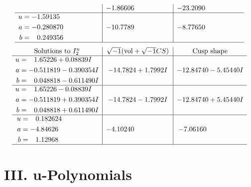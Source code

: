 \documentclass[1p]{elsarticle_modified}
\theoremstyle{definition}
\newcommand{\I}{\sqrt{-1}}
\begin{document}
$$\begin{array}{c|c|c}
 & -1.86606\phantom{ +0.000000I} & -23.2090\phantom{ +0.000000I} \\ \hline\begin{aligned}
u &= -1.59135\phantom{ +0.000000I} \\
a &= -0.280870\phantom{ +0.000000I} \\
b &= \phantom{-}0.249356\phantom{ +0.000000I}\end{aligned}
 & -10.7789\phantom{ +0.000000I} & -8.77650\phantom{ +0.000000I}\\
 \hline 
 \end{array}$$\newpage$$\begin{array}{c|c|c}  
\text{Solutions to }I^u_{2}& \I (\text{vol} + \sqrt{-1}CS) & \text{Cusp shape}\\
 \hline 
\begin{aligned}
u &= \phantom{-}1.65226 + 0.08839 I \\
a &= -0.511819 - 0.390354 I \\
b &= \phantom{-}0.048818 - 0.611490 I\end{aligned}
 & -14.7824 + 1.7992 I & -12.84740 - 5.45440 I \\ \hline\begin{aligned}
u &= \phantom{-}1.65226 - 0.08839 I \\
a &= -0.511819 + 0.390354 I \\
b &= \phantom{-}0.048818 + 0.611490 I\end{aligned}
 & -14.7824 - 1.7992 I & -12.84740 + 5.45440 I \\ \hline\begin{aligned}
u &= \phantom{-}0.182624\phantom{ +0.000000I} \\
a &= -4.84626\phantom{ +0.000000I} \\
b &= \phantom{-}1.12968\phantom{ +0.000000I}\end{aligned}
 & -4.10240\phantom{ +0.000000I} & -7.06160\phantom{ +0.000000I}\\
 \hline 
 \end{array}$$\newpage
\newpage\renewcommand{\arraystretch}{1}
\centering \section*{ III. u-Polynomials}
\end{document}
